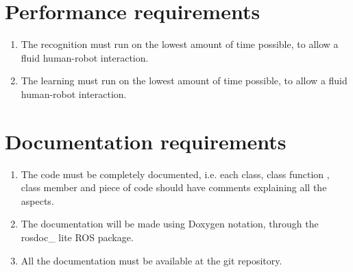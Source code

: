 \documentclass{article}
\makeatletter
\def\threedigits#1{\expandafter\@threedigits\csname c@#1\endcsname}
\def\@threedigits#1{%
  \ifnum#1<100 0\fi
  \ifnum#1<10 0\fi
  \number#1}
\makeatother
\begin{document}
\section{Performance requirements}

\begin{enumerate}[label=\textbf{PR\threedigits*}]
\item The recognition must run on the lowest amount of time possible, to allow a fluid human-robot interaction.
\item The learning must run on the lowest amount of time possible, to allow a fluid human-robot interaction.
\end{enumerate}



\section{Documentation requirements}
\begin{enumerate}[label=\textbf{DR\threedigits*}]
	\item The code must be completely documented, i.e. each class, class function , class member and piece of code should have comments explaining all the aspects. 
	\item The documentation will be made using Doxygen notation, through the rosdoc\_ lite 
	ROS package. 
	\item All the documentation must be available at the git repository. 
\end{enumerate}

\end{document}
